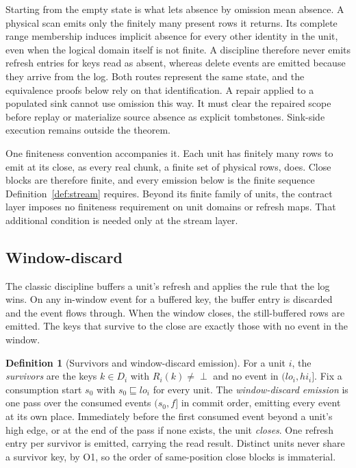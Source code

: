 \documentclass[sigconf,nonacm,10pt]{acmart}
\theoremstyle{plain}
\theoremstyle{definition}
\newtheorem{definition}{Definition}[section]
\newcommand{\pre}{\sqsubseteq}                   %
\newcommand{\window}[2]{(#1,#2]}                 %
\begin{document}
Starting from the empty state is what lets absence by omission mean absence.
A physical scan emits only the finitely many present
rows it returns. Its complete range membership induces implicit
absence for every other identity in the unit, even when the logical
domain itself is not finite. A discipline therefore never emits
refresh entries for keys read as absent, whereas delete events are
emitted because they arrive from the log. Both routes represent the same
state, and the equivalence proofs below rely on that identification.
A repair applied to a populated sink cannot use omission this way. It
must clear the repaired scope before replay or materialize source
absence as explicit tombstones. Sink-side execution remains outside
the theorem.

One finiteness convention accompanies it. Each unit
has finitely many rows to emit at its close, as every real
chunk, a finite set of physical rows, does. Close blocks are
therefore finite, and every emission below is the finite sequence
Definition~\ref{def:stream} requires. Beyond its finite family of
units, the contract layer imposes no finiteness requirement on unit
domains or refresh maps. That additional condition is needed only at
the stream layer.

\subsection{Window-discard}\label{sec:merge-discard}

The classic discipline buffers a unit's refresh and applies the rule that the log wins. On any in-window event for a buffered
key, the buffer entry is discarded and the event flows through. When
the window closes, the still-buffered rows are emitted. The keys that survive to the close are exactly those with no event in the window.

\begin{definition}[Survivors and window-discard emission]
\label{def:discard}
For a unit $i$, the \emph{survivors} are the keys
$k \in D_i$ with $R_i(k) \neq \perp$ and no event in
$\window{lo_i}{hi_i}$. Fix a consumption start $s_0$ with
$s_0 \pre lo_i$ for every unit. The \emph{window-discard emission}
is one pass over the consumed events $\window{s_0}{f}$ in commit
order, emitting every event at its own place. Immediately before
the first consumed event beyond a unit's high edge, or at the end
of the pass if none exists, the unit \emph{closes}. One refresh
entry per survivor is emitted, carrying the read result.
Distinct units never share a survivor key, by O1, so the order of
same-position close blocks is immaterial.
\end{definition}
\end{document}
